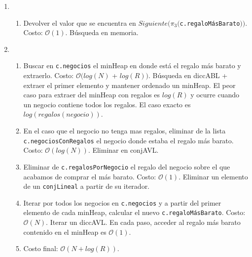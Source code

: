 \documentclass[10pt, a4paper]{article}
\newcommand{\bigO}{\mathcal{O}}
\begin{document}
\begin{Algoritmos}
\begin{enumerate}
		\item {}
		\begin{enumerate}
			\item Devolver el valor que se encuentra en $Siguiente(\pi_{3}($\texttt{c.regaloM\'asBarato}$))$. Costo: $\bigO(1)$. B\'usqueda en memoria.
		\end{enumerate}

		\item {}
		\begin{enumerate}
			\item Buscar en \texttt{c.negocios} el minHeap en donde est\'a el regalo m\'as barato y extraerlo. Costo: $\bigO(log(N)$ + $log(R))$. B\'usqueda en diccABL + extraer el primer elemento y mantener ordenado un minHeap. El peor caso para extraer del minHeap con regalos es $log(R)$ y ocurre cuando un negocio contiene todos los regalos. El caso exacto es $log(regalos(negocio))$.
			\item En el caso que el negocio no tenga mas regalos, eliminar de la lista \texttt{c.negociosConRegalos} el negocio donde estaba el regalo m\'as barato. Costo: $\bigO(log(N))$. Eliminar en conjAVL.
			\item Eliminar de \texttt{c.regalosPorNegocio} el regalo del negocio sobre el que acabamos de comprar el m\'as barato. Costo: $\bigO(1)$. Eliminar un elemento de un \texttt{conjLineal} a partir de su iterador.
			\item Iterar por todos los negocios en \texttt{c.negocios} y a partir del primer elemento de cada minHeap, calcular el nuevo \texttt{c.regaloM\'asBarato}. Costo: $\bigO(N)$. Iterar un diccAVL. En cada paso, acceder al regalo m\'as barato contenido en el minHeap es $\bigO(1)$.
			\item Costo final: $\bigO(N + log(R))$.
		\end{enumerate}
	\end{enumerate}


\end{Algoritmos}
\end{document}
